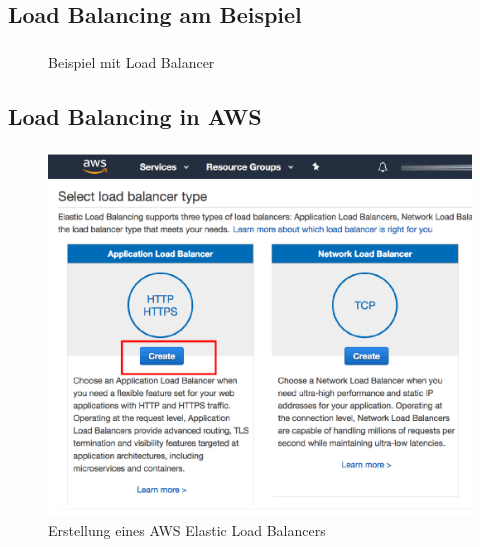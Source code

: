 \subsection{Load Balancing am Beispiel}
\begin{frame}
    \frametitle{\insertsection}
    \framesubtitle{\insertsubsection}

    \vspace*{-22pt}
    \begin{figure}[h]
        \centering
		\resizebox{!}{.75\textheight}{%
			
		}
		\captionsetup{aboveskip=2pt}
        \caption{Beispiel mit Load Balancer}
    \end{figure}
\end{frame}

\subsection{Load Balancing in AWS}
\begin{frame}
    \frametitle{\insertsection}
    \framesubtitle{\insertsubsection}
	
	\vspace{-12pt} %
    \begin{figure}[h]
        \centering
        \includegraphics[height=0.65\textheight]{../images/aws-elb-creation}
        \caption{Erstellung eines AWS Elastic Load Balancers~\cite{bitnamiConfigureElastic}}
    \end{figure}
\end{frame}

